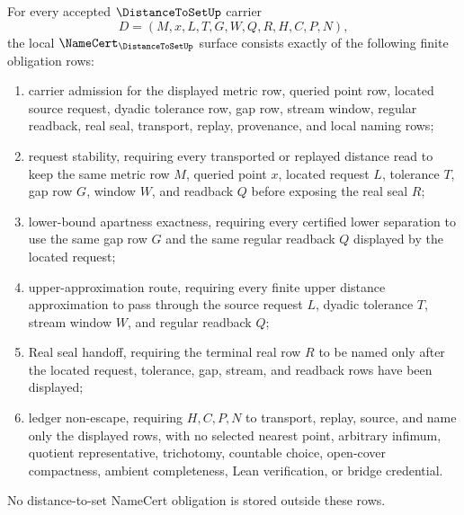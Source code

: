 \begin{theorem}
\label{thm:distance-to-set-namecert-obligations}
For every accepted $\DistanceToSetUp$ carrier
$$
D=(M,x,L,T,G,W,Q,R,H,C,P,N),
$$
the local $\NameCert_{\DistanceToSetUp}$ surface consists exactly of the following finite obligation rows:
\begin{enumerate}
\item carrier admission for the displayed metric row, queried point row, located source request, dyadic tolerance row, gap row, stream window, regular readback, real seal, transport, replay, provenance, and local naming rows;
\item request stability, requiring every transported or replayed distance read to keep the same metric row $M$, queried point $x$, located request $L$, tolerance $T$, gap row $G$, window $W$, and readback $Q$ before exposing the real seal $R$;
\item lower-bound apartness exactness, requiring every certified lower separation to use the same gap row $G$ and the same regular readback $Q$ displayed by the located request;
\item upper-approximation route, requiring every finite upper distance approximation to pass through the source request $L$, dyadic tolerance $T$, stream window $W$, and regular readback $Q$;
\item Real seal handoff, requiring the terminal real row $R$ to be named only after the located request, tolerance, gap, stream, and readback rows have been displayed;
\item ledger non-escape, requiring $H,C,P,N$ to transport, replay, source, and name only the displayed rows, with no selected nearest point, arbitrary infimum, quotient representative, trichotomy, countable choice, open-cover compactness, ambient completeness, Lean verification, or bridge credential.
\end{enumerate}
No distance-to-set NameCert obligation is stored outside these rows.
\end{theorem}

